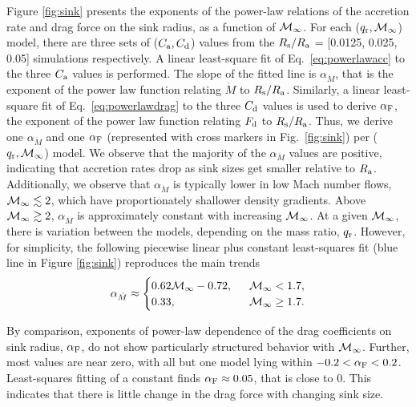 Figure \ref{fig:sink} presents the exponents of the power-law relations of the accretion rate and drag force on the sink radius, as a function of ${\cal M}_{\infty}$.  For each ($q_{\rm r}, \cal M_\infty$) model, there are three sets of ($C_{\rm a}, C_{\rm d}$) values from the $R_{\rm s}/R_{\rm a}$ = [0.0125, 0.025, 0.05] simulations respectively. A linear least-square fit of Eq.~\ref{eq:powerlawacc} to the three $C_{\rm a}$ values is performed. The slope of the fitted line is $\alpha_{\dot M}$, that is the exponent of the power law function relating $\dot M$ to $R_{\rm s}/R_{\rm a}$. Similarly, a linear least-square fit of Eq.~\ref{eq:powerlawdrag} to the three $C_{\rm d}$ values is used to derive $\alpha_{\rm F}$, the exponent of the power law function relating $F_{\rm d}$ to $R_{\rm s}/R_{\rm a}$. Thus, we derive one $\alpha_{\dot M}$ and one $\alpha_{\rm F}$ (represented with cross markers in Fig.~\ref{fig:sink}) per ($q_{\rm r}, \cal{M}_\infty$) model. We observe that the majority of the $\alpha_{\dot M}$ values are positive, indicating that accretion rates drop as sink sizes get smaller relative to $R_{\rm a}$. Additionally, we observe that $\alpha_{\dot M}$ is typically lower in low Mach number flows, ${\cal M}_\infty \lesssim 2$, which have proportionately shallower density gradients. Above  ${\cal M}_\infty \gtrsim 2$, $\alpha_{\dot M}$ is approximately constant with increasing ${\cal M}_\infty$. At a given ${\cal M}_\infty$, there is variation between the models, depending on the mass ratio, $q_{\rm r}$. However, for simplicity, the following piecewise linear plus constant least-squares fit (blue line in Figure \ref{fig:sink}) reproduces the main trends
\begin{equation}\label{eq:piecewise}
\alpha_{\dot M} \approx 
\begin{cases}
0.62 {\cal M}_\infty - 0.72,& \ \ {\cal M}_\infty < 1.7, \\
0.33,& \ \ {\cal M}_\infty \geq 1.7 .
\end{cases}
\end{equation}



By comparison, exponents of power-law dependence of the drag coefficients on sink radius, $\alpha_{\rm F}$, do not show particularly structured behavior with ${\cal M}_\infty$. Further, most values are near zero, with all but one model lying within $-0.2 < \alpha_{\rm F} < 0.2$. Least-squares fitting of a constant finds $\alpha_{\rm F} \approx 0.05$, that is close to 0. This indicates that there is little change in the drag force with changing sink size.

